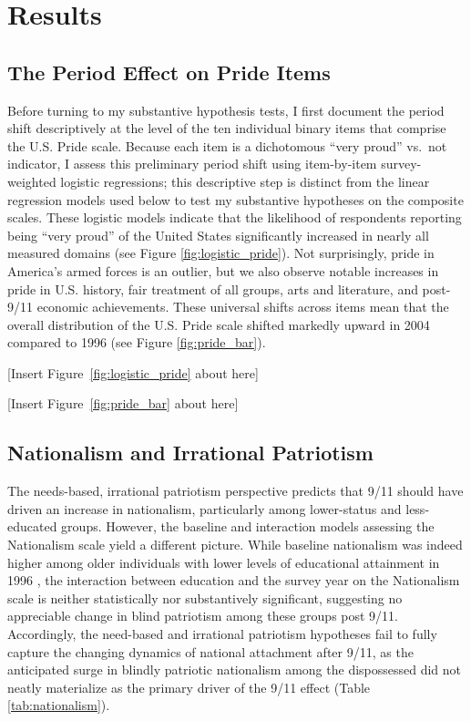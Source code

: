 \documentclass[12pt,letterpaper]{article}
\begin{document}
\section{Results}

\subsection{The Period Effect on Pride Items}

Before turning to my substantive hypothesis tests, I first document the period shift descriptively at the level of the ten individual binary items that comprise the U.S. Pride scale. Because each item is a dichotomous ``very proud'' vs.\ not indicator, I assess this preliminary period shift using item-by-item survey-weighted logistic regressions; this descriptive step is distinct from the linear regression models used below to test my substantive hypotheses on the composite scales. These logistic models indicate that the likelihood of respondents reporting being ``very proud'' of the United States significantly increased in nearly all measured domains (see Figure \ref{fig:logistic_pride}). Not surprisingly, pride in America's armed forces is an outlier, but we also observe notable increases in pride in U.S. history, fair treatment of all groups, arts and literature, and post-9/11 economic achievements. These universal shifts across items mean that the overall distribution of the U.S. Pride scale shifted markedly upward in 2004 compared to 1996 (see Figure \ref{fig:pride_bar}).

[Insert Figure~\ref{fig:logistic_pride} about here]

[Insert Figure~\ref{fig:pride_bar} about here]

\subsection{Nationalism and Irrational Patriotism}

The needs-based, irrational patriotism perspective predicts that 9/11 should have driven an increase in nationalism, particularly among lower-status and less-educated groups. However, the baseline and interaction models assessing the Nationalism scale yield a different picture. While baseline nationalism was indeed higher among older individuals with lower levels of educational attainment in 1996 \citep{jost2003social-206}, the interaction between education and the survey year on the Nationalism scale is neither statistically nor substantively significant, suggesting no appreciable change in blind patriotism among these groups post 9/11. Accordingly, the need-based and irrational patriotism hypotheses fail to fully capture the changing dynamics of national attachment after 9/11, as the anticipated surge in blindly patriotic nationalism among the dispossessed did not neatly materialize as the primary driver of the 9/11 effect (Table \ref{tab:nationalism}).
\end{document}
